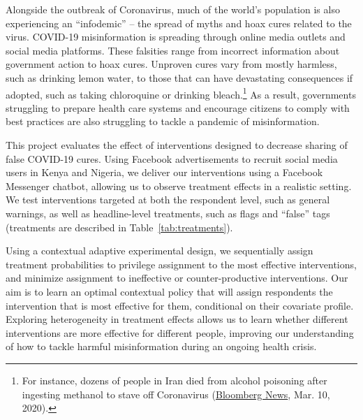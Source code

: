 \documentclass[letterpaper, 12pt, parskip=full,]{scrartcl}
\begin{document}
Alongside the outbreak of Coronavirus, much of the world's population is also experiencing an ``infodemic'' -- the spread of myths and hoax cures related to the virus. COVID-19 misinformation is spreading through online media outlets and social media platforms. These falsities range from incorrect information about government action to hoax cures. Unproven cures vary from mostly harmless, such as drinking lemon water, to those that can have devastating consequences if adopted, such as taking chloroquine or drinking bleach.\footnote{For instance, dozens of people in Iran died from alcohol poisoning after ingesting methanol to stave off Coronavirus (\href{https://nationalpost.com/news/world/rumours-that-alcohol-kills-covid-19-leaves-21-iranians-dead-from-poisoning}{Bloomberg News}, Mar. 10, 2020).} As a result, governments struggling to prepare health care systems and encourage citizens to comply with best practices are also struggling to tackle a pandemic of misinformation.

This project evaluates the effect of interventions designed to decrease sharing of false COVID-19 cures. Using Facebook advertisements to recruit social media users in Kenya and Nigeria, we deliver our interventions using a Facebook Messenger chatbot, allowing us to observe treatment effects in a realistic setting. We test interventions targeted at both the respondent level, such as general warnings, as well as headline-level treatments, such as flags and ``false'' tags (treatments are described in Table~\ref{tab:treatments}). 

Using a contextual adaptive experimental design, we sequentially assign treatment probabilities to privilege assignment to the most effective interventions, and minimize assignment to ineffective or counter-productive interventions. Our aim is to learn an optimal contextual policy that will assign respondents the intervention that is most effective for them, conditional on their covariate profile. Exploring heterogeneity in treatment effects allows us to learn whether different interventions are more effective for different people, improving our understanding of how to tackle harmful misinformation during an ongoing health crisis. 
\end{document}
